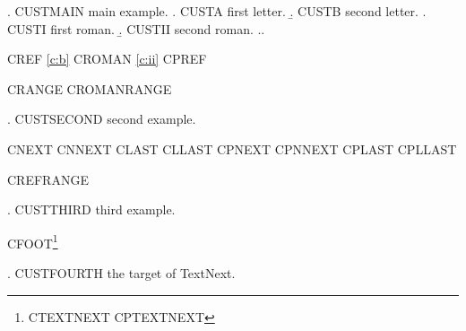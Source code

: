 
\renewcommand\SubExLBr{(}\renewcommand\SubExRBr{)}
\renewcommand\SubSubExLBr{[}\renewcommand\SubSubExRBr{]}
\renewcommand\firstrefdash{:}
\renewcommand\secondrefdash{/}
\renewcommand\rangedash{to}

\ex.\label{c:one} CUSTMAIN main example.
\a. CUSTA first letter.
\b. CUSTB second letter.
\a. CUSTI first roman.
\b. CUSTII second roman.
\z.\z.

CREF \ref{c:b} CROMAN \ref{c:ii} CPREF 

CRANGE  CROMANRANGE 

\ex. CUSTSECOND second example.

CNEXT \Next{} CNNEXT \NNext{} CLAST \Last{} CLLAST \LLast{}
CPNEXT \pNext{} CPNNEXT \pNNext{} CPLAST \pLast{} CPLLAST \pLLast{}

CREFRANGE 

\ex. CUSTTHIRD third example.

CFOOT\footnote{CTEXTNEXT \TextNext{} CPTEXTNEXT \pTextNext{}}

\ex. CUSTFOURTH the target of TextNext.

